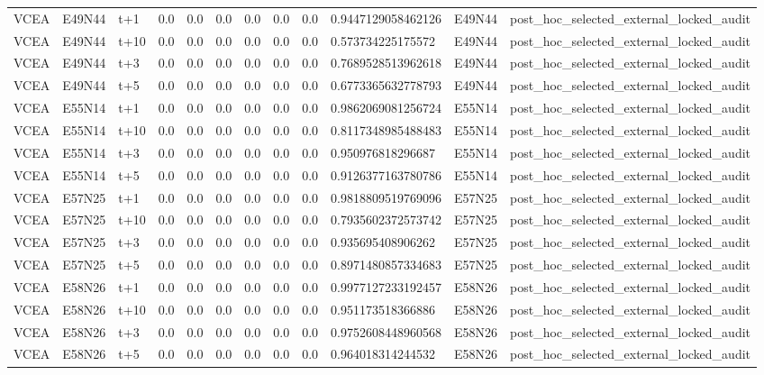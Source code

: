 \begin{landscape}
\begin{longtable}{llllllllllll}
VCEA & E49N44 & t+1 & 0.0 & 0.0 & 0.0 & 0.0 & 0.0 & 0.0 & 0.9447129058462126 & E49N44 & post\_hoc\_selected\_external\_locked\_audit \\
VCEA & E49N44 & t+10 & 0.0 & 0.0 & 0.0 & 0.0 & 0.0 & 0.0 & 0.573734225175572 & E49N44 & post\_hoc\_selected\_external\_locked\_audit \\
VCEA & E49N44 & t+3 & 0.0 & 0.0 & 0.0 & 0.0 & 0.0 & 0.0 & 0.7689528513962618 & E49N44 & post\_hoc\_selected\_external\_locked\_audit \\
VCEA & E49N44 & t+5 & 0.0 & 0.0 & 0.0 & 0.0 & 0.0 & 0.0 & 0.6773365632778793 & E49N44 & post\_hoc\_selected\_external\_locked\_audit \\
VCEA & E55N14 & t+1 & 0.0 & 0.0 & 0.0 & 0.0 & 0.0 & 0.0 & 0.9862069081256724 & E55N14 & post\_hoc\_selected\_external\_locked\_audit \\
VCEA & E55N14 & t+10 & 0.0 & 0.0 & 0.0 & 0.0 & 0.0 & 0.0 & 0.8117348985488483 & E55N14 & post\_hoc\_selected\_external\_locked\_audit \\
VCEA & E55N14 & t+3 & 0.0 & 0.0 & 0.0 & 0.0 & 0.0 & 0.0 & 0.950976818296687 & E55N14 & post\_hoc\_selected\_external\_locked\_audit \\
VCEA & E55N14 & t+5 & 0.0 & 0.0 & 0.0 & 0.0 & 0.0 & 0.0 & 0.9126377163780786 & E55N14 & post\_hoc\_selected\_external\_locked\_audit \\
VCEA & E57N25 & t+1 & 0.0 & 0.0 & 0.0 & 0.0 & 0.0 & 0.0 & 0.9818809519769096 & E57N25 & post\_hoc\_selected\_external\_locked\_audit \\
VCEA & E57N25 & t+10 & 0.0 & 0.0 & 0.0 & 0.0 & 0.0 & 0.0 & 0.7935602372573742 & E57N25 & post\_hoc\_selected\_external\_locked\_audit \\
VCEA & E57N25 & t+3 & 0.0 & 0.0 & 0.0 & 0.0 & 0.0 & 0.0 & 0.935695408906262 & E57N25 & post\_hoc\_selected\_external\_locked\_audit \\
VCEA & E57N25 & t+5 & 0.0 & 0.0 & 0.0 & 0.0 & 0.0 & 0.0 & 0.8971480857334683 & E57N25 & post\_hoc\_selected\_external\_locked\_audit \\
VCEA & E58N26 & t+1 & 0.0 & 0.0 & 0.0 & 0.0 & 0.0 & 0.0 & 0.9977127233192457 & E58N26 & post\_hoc\_selected\_external\_locked\_audit \\
VCEA & E58N26 & t+10 & 0.0 & 0.0 & 0.0 & 0.0 & 0.0 & 0.0 & 0.951173518366886 & E58N26 & post\_hoc\_selected\_external\_locked\_audit \\
VCEA & E58N26 & t+3 & 0.0 & 0.0 & 0.0 & 0.0 & 0.0 & 0.0 & 0.9752608448960568 & E58N26 & post\_hoc\_selected\_external\_locked\_audit \\
VCEA & E58N26 & t+5 & 0.0 & 0.0 & 0.0 & 0.0 & 0.0 & 0.0 & 0.964018314244532 & E58N26 & post\_hoc\_selected\_external\_locked\_audit \\
\bottomrule
\end{longtable}
\end{landscape}

